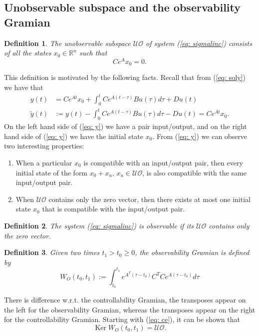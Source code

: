 \documentclass[11pt,a4paper,titlepage]{article}
\newtheorem{definition}{Definition}
\begin{document}
\subsection{Unobservable subspace and the observability Gramian}
\begin{definition}
	The \emph{unobservable} subspace $\mathcal{UO}$ of system (\ref{eq: sigmalinc}) consists of all the states $x_0\in\mathbb{R}^n$ such that
	\begin{equation}
	C e^{A} x_0 = 0.
		\label{eq: ce}
	\end{equation}
\end{definition}
This definition is motivated by the following facts.
Recall that from (\ref{eq: soly}) we have that
\begin{align}
	y(t) &= Ce^{At}x_0 + \int_0^tCe^{A(t-\tau)}Bu(\tau)d\tau + Du(t) \nonumber \\
	\tilde y(t) &:= y(t) - \int_0^tCe^{A(t-\tau)}Bu(\tau)d\tau - Du(t) = Ce^{At}x_0. \label{eq: y}
\end{align}
On the left hand side of (\ref{eq: y}) we have a pair input/output, and on the right hand side of (\ref{eq: y}) we have the initial state $x_0$. From (\ref{eq: y}) we can observe two interesting properties:
\begin{enumerate}
	\item When a particular $x_0$ is compatible with an input/output pair, then every initial state of the form $x_0 + x_u, \, x_u\in\mathcal{UO}$, is also compatible with the same input/output pair.
	\item When $\mathcal{UO}$ contains only the zero vector, then there exists at most one initial state $x_0$ that is compatible with the input/output pair.
\end{enumerate}

\begin{definition}
	The system (\ref{eq: sigmalinc}) is observable if its $\mathcal{UO}$ contains only the zero vector.
\end{definition}

\begin{definition}
	Given two times $t_1>t_0\geq 0$, the observability Gramian is defined by
	\begin{equation}
		W_O(t_0,t_1) := \int_{t_0}^{t_1}e^{A^T(\tau - t_0)} C^T Ce^{A(\tau - t_0)}d\tau
	\end{equation}
\end{definition}
There is difference w.r.t. the controllability Gramian, the transposes appear on the left for the observability Gramian, whereas the transposes appear on the right for the controllability Gramian.
Starting with (\ref{eq: ce}), it can be shown that
\begin{equation}
	\operatorname{Ker}W_O(t_0,t_1) = \mathcal{UO}.
\end{equation}
\end{document}
